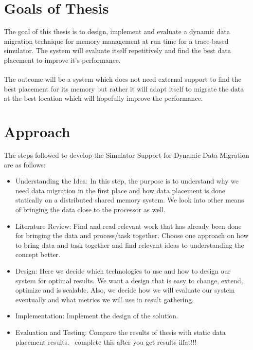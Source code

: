 \documentclass{listhesis}
\begin{document}
\section{Goals of Thesis}
The goal of this thesis is to design, implement and evaluate a dynamic data migration technique for memory management at run time for a trace-based simulator. The system will evaluate itself repetitively and find the best data placement to improve it's performance. \\
\\
The outcome will be a system which does not need external support to find the best placement for its memory but rather it will adapt itself to migrate the data at the best location which will hopefully improve the performance. 
\section{Approach}
The steps followed to develop the Simulator Support for Dynamic Data Migration are as follows:
\begin{itemize}
  \item Understanding the Idea: In this step, the purpose is to understand why we need data migration in the first place and how data placement is done statically on a distributed shared memory system. We look into other means of bringing the data close to the processor as well. 
  \item Literature Review: Find and read relevant work that has already been done for bringing the data and process/task together. Choose one approach on how to bring data and task together and find relevant ideas to understanding the concept better. 
  \item Design: Here we decide which technologies to use and how to design our system for optimal results. We want a design that is easy to change, extend, optimize and is scalable. Also, we decide how we will evaluate our system eventually and what metrics we will use in result gathering. 
  \item Implementation: Implement the design of the solution. 
  \item Evaluation and Testing: Compare the results of thesis with static data placement results. --complete this after you get results iffat!!!
\end{itemize}
\end{document}
